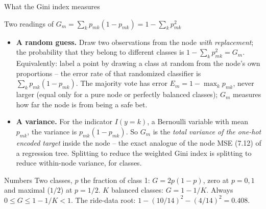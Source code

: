 \documentclass[10pt,aspectratio=169]{beamer}
\begin{document}
\begin{frame}{What the Gini index measures}
\small
\begin{block}{Two readings of $G_m=\sum_k p_{mk}(1-p_{mk})=1-\sum_k p_{mk}^2$}
\begin{itemize}
  \item \textbf{A random guess.}  Draw two observations from the node
        \emph{with replacement}; the probability that they belong to
        different classes is $1-\sum_kp_{mk}^2=G_m$.  Equivalently: label a
        point by drawing a class at random from the node's own
        proportions -- the error rate of that randomized classifier is
        $\sum_kp_{mk}(1-p_{mk})$.  The majority vote has error
        $E_m=1-\max_kp_{mk}$, never larger (equal only for a pure node or
        perfectly balanced classes); $G_m$ measures how far the node is from
        being a safe bet.
  \item \textbf{A variance.}  For the indicator $I(y=k)$, a Bernoulli
        variable with mean $p_{mk}$, the variance is $p_{mk}(1-p_{mk})$.
        So $G_m$ is the \emph{total variance of the one-hot encoded target}
        inside the node -- the exact analogue of the node MSE (7.12) of a
        regression tree.  Splitting to reduce the weighted Gini index is
        splitting to reduce within-node variance, for classes.
\end{itemize}
\end{block}
\begin{block}{Numbers}
Two classes, $p$ the fraction of class 1: $G=2p(1-p)$, zero at $p=0,1$ and
maximal ($1/2$) at $p=1/2$.  $K$ balanced classes: $G=1-1/K$.  Always
$0\le G\le 1-1/K<1$.  The ride-data root: $1-(10/14)^2-(4/14)^2=0.408$.
\end{block}
\end{frame}
\end{document}
